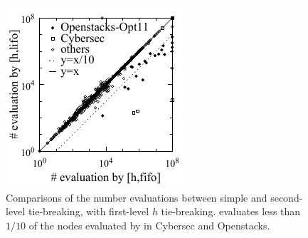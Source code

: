 \begin{table}[htb]
 \centering
  \setlength{\tabcolsep}{0.3em}
 
 \caption{Experiments comparing the coverages.
 Each cell shows the coverage of the domain solved with 5 min, 2GB.
 Zerocost domains are named as [original name]-[name of nonzero action].
 Due to space, we only show 
 the domains whose maximum pairwise coverage difference $\mit{MaxDiff}$
 (for the randomized configurations, we used the mean coverage of 10
 runs to calculate the coverage difference)
 $\geq 2$. (Details for domains with $\mit{MaxDiff}<2$, and M\&S results,
 are in the supplemental material, Table \ref{lmcut-ipc-full}-\ref{mands-zerocost-full}).
 The following domains had $\mit{MaxDiff}<2$:\\
 (1) Domains with $\mit{MaxDiff} = 0$ (same coverages by all
 configuration and all runs):
.\\
 (2) $0 < \mit{MaxDiff} < 1$:
 .\\
 (3) $1 < \mit{MaxDiff} < 2$:
 .\\
}  \label{depth}
\end{table}

\begin{figure}[tb]
 \centering {}
 \includegraphics{tables/aaai16-30min-5min-cut/aaai16prelim3/evaluated-lmcut_ff-lmcut_lf-mono.pdf}
 \caption{Comparisons of the number evaluations between simple \lifo and
 \fifo second-level tie-breaking, with first-level $h$
 tie-breaking. \lifo evaluates less than $1/10$ of the nodes evaluated
 by \fifo in Cybersec and Openstacks.}
 \label{f-h-eval}
\end{figure}


